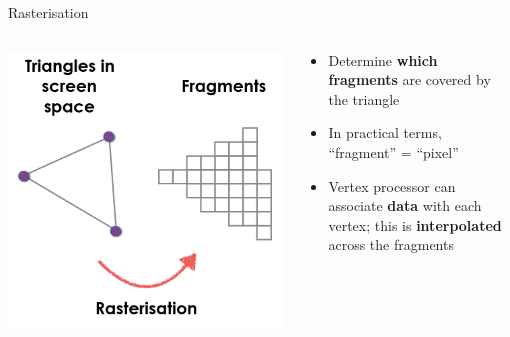 \begin{frame}{Rasterisation}
\begin{columns}
\begin{column}{0.3\textwidth}
\includegraphics[width=\textwidth]{pipeline_2}
\end{column}
\begin{column}{0.65\textwidth}
\begin{itemize}
	\pause\item Determine \textbf{which fragments} are covered by the triangle
	\pause\item In practical terms, ``fragment'' = ``pixel''
	\pause\item Vertex processor can associate \textbf{data} with each vertex;
	this is \textbf{interpolated} across the fragments
\end{itemize}
\end{column}
\end{columns}
\end{frame}

